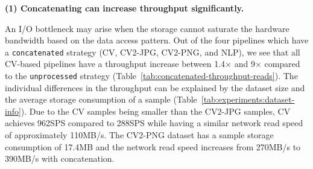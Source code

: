 {\color{diff}
\vspace{-0.2cm}
\begin{table}[h]
\caption{{\color{diff}Throughput and average network read speeds for strategies with concatenation.}}
\label{tab:concatenated-throughput-reads}
\end{table}
\vspace{-0.7cm}

\textbf{(1) Concatenating can increase throughput significantly.}

An I/O bottleneck may arise when the storage cannot saturate the hardware bandwidth based on the data access pattern.
Out of the four pipelines which have a \texttt{concatenated} strategy (CV, CV2-JPG, CV2-PNG, and NLP), we see that all CV-based pipelines have a throughput increase between 1.4$\times$ and 9$\times$ compared to the \texttt{unprocessed} strategy (Table~\ref{tab:concatenated-throughput-reads}).
The individual differences in the throughput can be explained by the dataset size and the average storage consumption of a sample (Table~\ref{tab:experiments:dataset-info}).
Due to the CV samples being smaller than the CV2-JPG samples, CV achieves 962\:SPS compared to 288\:SPS while having a similar network read speed of approximately 110\:MB/s.
The CV2-PNG dataset has a sample storage consumption of 17.4\:MB and the network read speed increases from 270\:MB/s to 390\:MB/s with concatenation.

}
